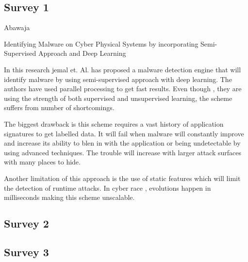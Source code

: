 \documentclass[10pt]{llncs}
\begin{document}
%
\subsection{Survey 1}

Abawaja

Identifying Malware on Cyber Physical Systems by incorporating Semi-Supervised Approach and Deep Learning

In this research jemal et. Al. has proposed a malware detection engine that will identify malware by using semi-supervised approach with deep learning. The authors have used parallel processing to get fast results. Even though , they are using the strength of both supervised and unsupervised learning, the scheme suffers from number of shortcomings.



The biggest drawback is this scheme requires a vast history of application signatures to get labelled data. It will fail when malware will constantly improve and increase its ability to blen in with the application or being undetectable by using advanced techniques. The trouble will increase with larger attack surfaces with many places to hide.

Another limitation of this approach is the use of static features which will limit the detection of runtime attacks. In cyber race , evolutions happen in milliseconds making this scheme unscalable.

%
\subsection{Survey 2}






%
\subsection{Survey 3}



\end{document}
